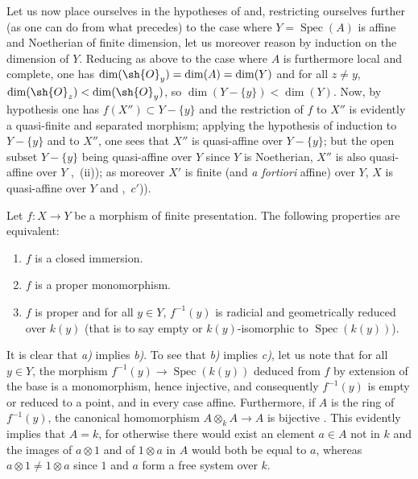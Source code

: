 Let us now place ourselves in the hypotheses of  and, restricting ourselves further (as one can do from what precedes) to the case where $Y=\operatorname{Spec}(A)$ is affine and Noetherian of finite dimension, let us moreover reason by induction on the dimension of $Y$.
Reducing as above to the case where $A$ is furthermore local and complete, one has $\dim(\sh{O}_y)=\dim(A)=\dim(Y)$ and for all $z\neq y$, $\dim(\sh{O}_z)<\dim(\sh{O}_y)$, so $\dim(Y-\{y\})<\dim(Y)$.
Now, by hypothesis one has $f(X'')\subset Y-\{y\}$ and the restriction of $f$ to $X''$ is evidently a quasi-finite and separated morphism; applying the hypothesis of induction to $Y-\{y\}$ and to $X''$, one sees that $X''$ is quasi-affine over $Y-\{y\}$; but the open subset $Y-\{y\}$ being quasi-affine over $Y$ since $Y$ is Noetherian, $X''$ is also quasi-affine over $Y$ ,~(ii)); as moreover $X'$ is finite (and \emph{a fortiori} affine) over $Y$, $X$ is quasi-affine over $Y$  and ,~$c'$)).

\begin{proposition}[8.11.5]
\label{IV.8.11.5}
Let $f:X\to Y$ be a morphism of finite presentation.
The following properties are equivalent:
\begin{enumerate}[label=\emph{\alph*)}]
  \item $f$ is a closed immersion.
  \item $f$ is a proper monomorphism.
  \item $f$ is proper and for all $y\in Y$, $f^{-1}(y)$ is radicial and geometrically reduced over $k(y)$ (that is to say empty or $k(y)$-isomorphic to $\operatorname{Spec}(k(y))$).
\end{enumerate}
\end{proposition}

It is clear that \emph{a)} implies \emph{b)}.
To see that \emph{b)} implies \emph{c)}, let us note  that for all $y\in Y$, the morphism $f^{-1}(y)\to\operatorname{Spec}(k(y))$ deduced from $f$ by extension of the base is a monomorphism, hence injective, and consequently $f^{-1}(y)$ is empty or reduced to a point, and in every case affine.
Furthermore, if $A$ is the ring of $f^{-1}(y)$, the canonical homomorphism $A\otimes_k A\to A$ is bijective .
This evidently implies that $A=k$, for otherwise there would exist an element $a\in A$ not in $k$ and the images of $a\otimes 1$ and of $1\otimes a$ in $A$ would both be equal to $a$, whereas $a\otimes 1\neq1\otimes a$ since $1$ and $a$ form a free system over $k$.

